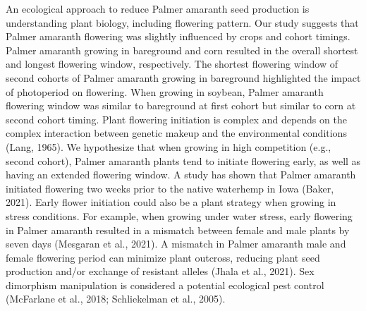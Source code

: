 \documentclass[utf8]{frontiersSCNS}
\begin{document}
An ecological approach to reduce Palmer amaranth seed production is
understanding plant biology, including flowering pattern. Our study
suggests that Palmer amaranth flowering was slightly influenced by crops
and cohort timings. Palmer amaranth growing in bareground and corn
resulted in the overall shortest and longest flowering window,
respectively. The shortest flowering window of second cohorts of Palmer
amaranth growing in bareground highlighted the impact of photoperiod on
flowering. When growing in soybean, Palmer amaranth flowering window was
similar to bareground at first cohort but similar to corn at second
cohort timing. Plant flowering initiation is complex and depends on the
complex interaction between genetic makeup and the environmental
conditions (Lang, 1965). We hypothesize that when growing in high
competition (e.g., second cohort), Palmer amaranth plants tend to
initiate flowering early, as well as having an extended flowering
window. A study has shown that Palmer amaranth initiated flowering two
weeks prior to the native waterhemp in Iowa (Baker, 2021). Early flower
initiation could also be a plant strategy when growing in stress
conditions. For example, when growing under water stress, early
flowering in Palmer amaranth resulted in a mismatch between female and
male plants by seven days (Mesgaran et al., 2021). A mismatch in Palmer
amaranth male and female flowering period can minimize plant outcross,
reducing plant seed production and/or exchange of resistant alleles
(Jhala et al., 2021). Sex dimorphism manipulation is considered a
potential ecological pest control (McFarlane et al., 2018; Schliekelman
et al., 2005).
\end{document}
